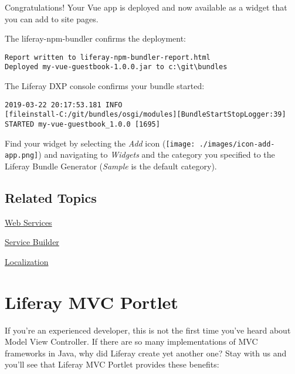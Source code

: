 Congratulations! Your Vue app is deployed and now available as a widget
that you can add to site pages.

The liferay-npm-bundler confirms the deployment:

\begin{verbatim}
Report written to liferay-npm-bundler-report.html
Deployed my-vue-guestbook-1.0.0.jar to c:\git\bundles
\end{verbatim}

The Liferay DXP console confirms your bundle started:

\begin{verbatim}
2019-03-22 20:17:53.181 INFO  
[fileinstall-C:/git/bundles/osgi/modules][BundleStartStopLogger:39] 
STARTED my-vue-guestbook_1.0.0 [1695]
\end{verbatim}

Find your widget by selecting the \emph{Add} icon
(\texttt{[image: ./images/icon-add-app.png]}) and navigating to
\emph{Widgets} and the category you specified to the Liferay Bundle
Generator (\emph{Sample} is the default category).

\section{Related Topics}\label{related-topics-2}

\href{/docs/7-2/frameworks/-/knowledge_base/f/web-services}{Web
Services}

\href{/docs/7-2/appdev/-/knowledge_base/a/service-builder}{Service
Builder}

\href{/docs/7-2/frameworks/-/knowledge_base/f/localization}{Localization}

\chapter{Liferay MVC Portlet}\label{liferay-mvc-portlet}

If you're an experienced developer, this is not the first time you've
heard about Model View Controller. If there are so many implementations
of MVC frameworks in Java, why did Liferay create yet another one? Stay
with us and you'll see that Liferay MVC Portlet provides these benefits:

